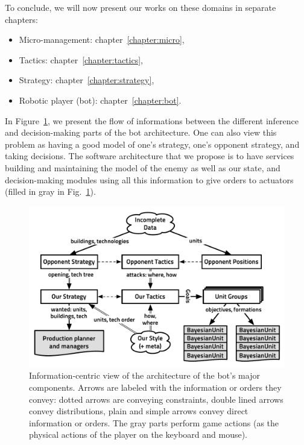 To conclude, we will now present our works on these domains in separate chapters:
\begin{itemize}
    \item Micro-management: chapter~\ref{chapter:micro},
    \item Tactics: chapter~\ref{chapter:tactics},
    \item Strategy: chapter~\ref{chapter:strategy},
    \item Robotic player (bot): chapter~\ref{chapter:bot}.
\end{itemize}
In Figure~\ref{fig:conceptbbq}, we present the flow of informations between the different inference and decision-making parts of the bot architecture. One can also view this problem as having a good model of one's strategy, one's opponent strategy, and taking decisions. The software architecture that we propose is to have services building and maintaining the model of the enemy as well as our state, and decision-making modules using all this information to give orders to actuators (filled in gray in Fig.~\ref{fig:conceptbbq}).

\begin{figure}[!ht]
\begin{center}
\includegraphics[width=0.96\columnwidth]{images/starcraft_bbq_concept.pdf}
\end{center}
\caption{Information-centric view of the architecture of the bot's major components. Arrows are labeled with the information or orders they convey: dotted arrows are conveying constraints, double lined arrows convey distributions, plain and simple arrows convey direct information or orders. The gray parts perform game actions (as the physical actions of the player on the keyboard and mouse).}
\label{fig:conceptbbq}
\end{figure}


